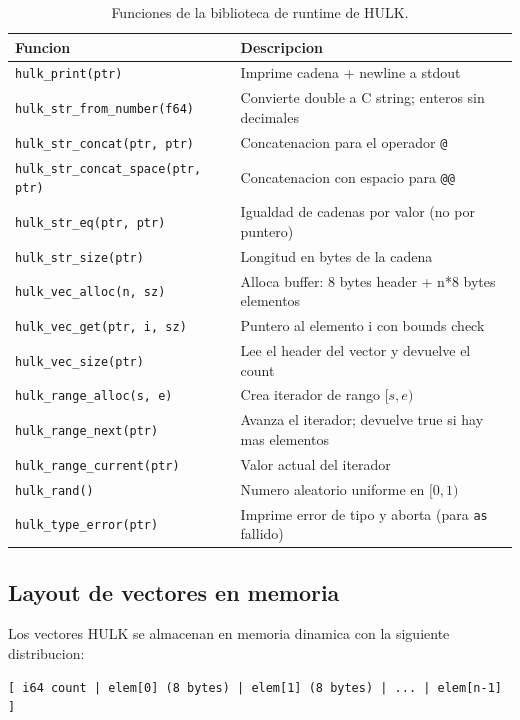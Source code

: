 \documentclass[12pt,a4paper]{article}
\begin{document}
\begin{table}[H]
\centering
\begin{tabular}{ll}
\toprule
\textbf{Funcion} & \textbf{Descripcion} \\
\midrule
\texttt{hulk\_print(ptr)} & Imprime cadena + newline a stdout \\
\texttt{hulk\_str\_from\_number(f64)} & Convierte double a C string; enteros sin decimales \\
\texttt{hulk\_str\_concat(ptr, ptr)} & Concatenacion para el operador \texttt{@} \\
\texttt{hulk\_str\_concat\_space(ptr, ptr)} & Concatenacion con espacio para \texttt{@@} \\
\texttt{hulk\_str\_eq(ptr, ptr)} & Igualdad de cadenas por valor (no por puntero) \\
\texttt{hulk\_str\_size(ptr)} & Longitud en bytes de la cadena \\
\texttt{hulk\_vec\_alloc(n, sz)} & Alloca buffer: 8 bytes header + n*8 bytes elementos \\
\texttt{hulk\_vec\_get(ptr, i, sz)} & Puntero al elemento i con bounds check \\
\texttt{hulk\_vec\_size(ptr)} & Lee el header del vector y devuelve el count \\
\texttt{hulk\_range\_alloc(s, e)} & Crea iterador de rango $[s, e)$ \\
\texttt{hulk\_range\_next(ptr)} & Avanza el iterador; devuelve true si hay mas elementos \\
\texttt{hulk\_range\_current(ptr)} & Valor actual del iterador \\
\texttt{hulk\_rand()} & Numero aleatorio uniforme en $[0,1)$ \\
\texttt{hulk\_type\_error(ptr)} & Imprime error de tipo y aborta (para \texttt{as} fallido) \\
\bottomrule
\end{tabular}
\caption{Funciones de la biblioteca de runtime de HULK.}
\end{table}

\subsection{Layout de vectores en memoria}

Los vectores HULK se almacenan en memoria dinamica con la siguiente distribucion:

\begin{verbatim}
[ i64 count | elem[0] (8 bytes) | elem[1] (8 bytes) | ... | elem[n-1] ]
\end{verbatim}
\end{document}
